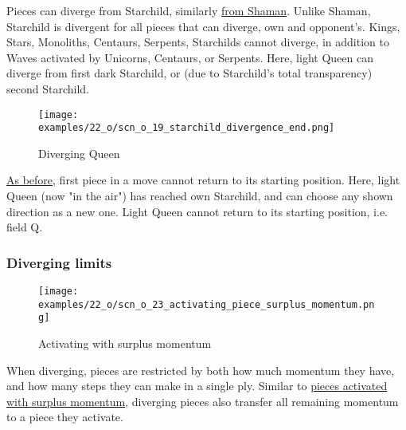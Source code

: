 \vspace*{-0.5\baselineskip}
Pieces can diverge from Starchild, similarly
\hyperref[fig:scn_cot_030_own_shaman_is_divergent_init]{from Shaman}. Unlike
Shaman, Starchild is divergent for all pieces that can diverge, own and opponent's.
Kings, Stars, Monoliths, Centaurs, Serpents, Starchilds cannot diverge, in addition
to Waves activated by Unicorns, Centaurs, or Serpents. Here, light Queen can
diverge from first dark Starchild, or (due to Starchild's total transparency)
second Starchild.

\vspace*{-0.9\baselineskip}
\noindent
\begin{figure}[!h]
\texttt{[image: examples/22\_o/scn\_o\_19\_starchild\_divergence\_end.png]}
\vspace*{-1.4\baselineskip}
\caption{Diverging Queen}
\label{fig:scn_o_19_starchild_divergence_end}
\end{figure}

\vspace*{-0.5\baselineskip}
\hyperref[fig:scn_cot_059_diverging_first_piece]{As before}, first piece in a move
cannot return to its starting position. Here, light Queen (now "in the air") has
reached own Starchild, and can choose any shown direction as a new one. Light Queen
cannot return to its starting position, i.e. field Q.

\clearpage %

\subsubsection*{Diverging limits}
\label{sec:One/Starchild/Divergence/Diverging limits}

\vspace*{-0.9\baselineskip}
\noindent
\begin{wrapfigure}[9]{l}{0.4\textwidth}
\centering
\texttt{[image: examples/22\_o/scn\_o\_23\_activating\_piece\_surplus\_momentum.png]}
\vspace*{-0.4\baselineskip}
\caption{Activating with surplus momentum}
\label{fig:scn_o_23_activating_piece_surplus_momentum}
\end{wrapfigure}
When diverging, pieces are restricted by both how much momentum they have, and how
many steps they can make in a single ply. \newline
\indent
Similar to
\hyperref[fig:scn_mv_33_single_step_piece_momentum]{pieces activated with surplus momentum},
diverging pieces also transfer all remaining momentum to a piece they activate.

